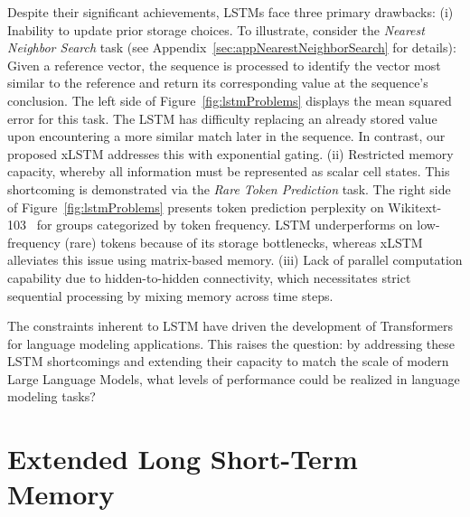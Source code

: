 Despite their significant achievements, LSTMs face three primary drawbacks: (i) Inability to update prior storage choices. To illustrate, consider the 
{\it Nearest Neighbor Search} task (see Appendix~\ref{sec:appNearestNeighborSearch} for details): Given a reference vector, the sequence is processed to identify the vector most similar to the reference and return its corresponding value at the sequence's conclusion. The left side of Figure~\ref{fig:lstmProblems} displays the mean squared error for this task. The LSTM has difficulty replacing an already stored value upon encountering a more similar match later in the sequence. In contrast, our proposed xLSTM addresses this with exponential gating. (ii) Restricted memory capacity, whereby all information must be represented as scalar cell states. This shortcoming is demonstrated via the {\it Rare Token Prediction} task. The right side of Figure~\ref{fig:lstmProblems} presents token prediction perplexity on Wikitext-103~\citep{Merity:17} for groups categorized by token frequency. LSTM underperforms on low-frequency (rare) tokens because of its storage bottlenecks, whereas xLSTM alleviates this issue using matrix-based memory. (iii) Lack of parallel computation capability due to hidden-to-hidden connectivity, which necessitates strict sequential processing by mixing memory across time steps.

The constraints inherent to LSTM have driven the development of Transformers~\citep{Vaswani:17} for language modeling applications. This raises the question: by addressing these LSTM shortcomings and extending their capacity to match the scale of modern Large Language Models, what levels of performance could be realized in language modeling tasks?

\section{Extended Long Short-Term Memory}
\label{sec:xLSTM}

